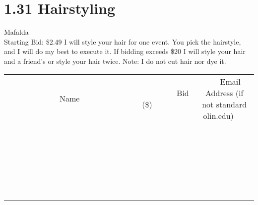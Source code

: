 \documentclass[11pt]{article}
\begin{document}
\section*{1.31 Hairstyling}
Mafalda
\\
Starting Bid: \$2.49
\newline
I will style your hair for one event. You pick the hairstyle, and I will do my best to execute it. If bidding exceeds \$20 I will style your hair and a friend's or style your hair twice.  Note: I do not cut hair nor dye it.
\\[6ex]
\begin{tabular}{c c c}
~~~~~~~~~~~~~Name~~~~~~~~~~~~~ & ~~~~~~~~~Bid (\$)~~~~~~~~~  & ~~~Email Address (if not standard olin.edu)~~~\\
 & & \\
\hline
 & & \\
\hline
 & & \\
\hline
 & & \\
\hline
 & & \\
\hline
 & & \\
\hline
 & & \\
\hline
 & & \\
\hline
 & & \\
\hline
 & & \\
\hline
 & & \\
\hline
 & & \\
\hline
 & & \\
\hline
 & & \\
\hline
 & & \\
\hline
 & & \\
\hline
 & & \\
\hline
 & & \\
\hline
 & & \\
\hline
 & & \\
\hline
 & & \\
\hline
 & & \\
\hline
 & & \\
\hline
 & & \\
\hline
 & & \\
\hline
 & & \\
\hline
\end{tabular}
\newpage
\end{document}
